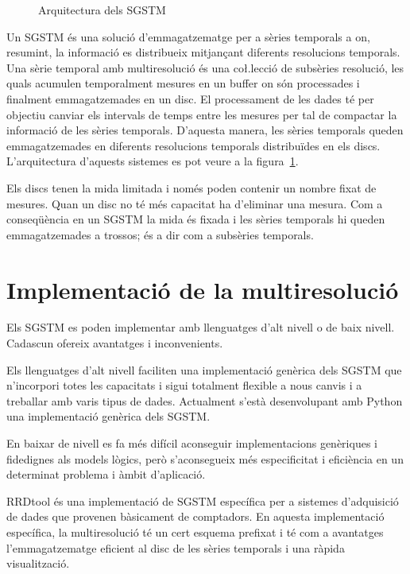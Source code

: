 \documentclass[paper=a4,parskip=half]{scrartcl}
\begin{document}
\begin{figure}[tp]
\centering

\caption{Arquitectura dels SGSTM}
\label{fig:model:bdstm}
\end{figure}


Un SGSTM és una solució d'emmagatzematge per a sèries temporals a on,
resumint, la informació es distribueix mitjançant diferents
resolucions temporals.  Una sèrie temporal amb multiresolució és una
co\l.lecció de subsèries resolució, les quals acumulen temporalment
mesures en un buffer on són processades i finalment emmagatzemades
en un disc. El processament de les dades té per objectiu canviar els
intervals de temps entre les mesures per tal de compactar la
informació de les sèries temporals. D'aquesta manera, les sèries
temporals queden emmagatzemades en diferents resolucions temporals
distribuïdes en els discs.  L'arquitectura d'aquests sistemes es pot
veure a la figura~\ref{fig:model:bdstm}.

Els discs tenen la mida limitada i només poden contenir un nombre
fixat de mesures. Quan un disc no té més capacitat ha d'eliminar una
mesura. Com a conseqüència en un SGSTM la mida és fixada i les sèries
temporals hi queden emmagatzemades a trossos; és a dir com a subsèries
temporals.



\section{Implementació de la multiresolució}

Els SGSTM es poden implementar amb llenguatges d'alt nivell o de baix
nivell. Cadascun ofereix avantatges i inconvenients.

Els llenguatges d'alt nivell faciliten una implementació genèrica dels
SGSTM que n'incorpori totes les capacitats i sigui totalment flexible
a nous canvis i a treballar amb varis tipus de dades. Actualment
s'està desenvolupant amb Python una implementació genèrica dels SGSTM.


En baixar de nivell es fa més difícil aconseguir implementacions
genèriques i fidedignes als models lògics, però s'aconsegueix més
especificitat i eficiència en un determinat problema i àmbit d'aplicació.

RRDtool és una implementació de SGSTM específica per a sistemes
d'adquisició de dades que provenen bàsicament de comptadors. En
aquesta implementació específica, la multiresolució té un cert esquema
prefixat i té com a avantatges l'emmagatzematge eficient al disc de les
sèries temporals i una ràpida visualització.
\end{document}
